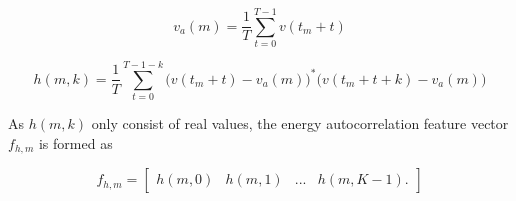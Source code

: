 \begin{equation} 
	v_a(m) = \frac{1}{T}\sum_{t=0}^{T-1}v(t_m+t)
\end{equation}

\begin{equation}
	h(m,k) = \frac{1}{T}\sum_{t=0}^{T-1-k}\big(v(t_m+t) - v_a(m)\big)^*\big(v(t_m+t+k) - v_a(m)\big)
\end{equation}

As $h(m,k)$ only consist of real values, the energy autocorrelation feature vector $f_{h,m}$ is formed as

\begin{equation}
	f_{h,m} = 
	\begin{bmatrix}
		h(m,0) & h(m,1) & ... & h(m,K-1).
	\end{bmatrix}
\end{equation}





